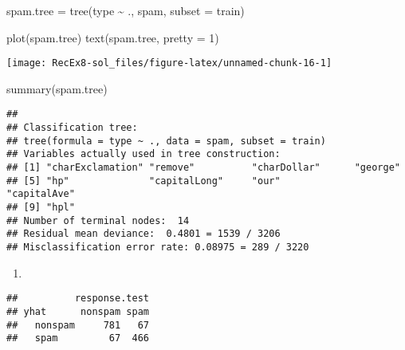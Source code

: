 \documentclass[
]{article}
\newenvironment{Shaded}{\begin{snugshade}}{\end{snugshade}}
\newcommand{\AttributeTok}[1]{\textcolor[rgb]{0.77,0.63,0.00}{#1}}
\newcommand{\DecValTok}[1]{\textcolor[rgb]{0.00,0.00,0.81}{#1}}
\newcommand{\FunctionTok}[1]{\textcolor[rgb]{0.00,0.00,0.00}{#1}}
\newcommand{\NormalTok}[1]{#1}
\newcommand{\OtherTok}[1]{\textcolor[rgb]{0.56,0.35,0.01}{#1}}
\newcommand{\SpecialCharTok}[1]{\textcolor[rgb]{0.00,0.00,0.00}{#1}}
\newcommand{\StringTok}[1]{\textcolor[rgb]{0.31,0.60,0.02}{#1}}
\providecommand{\tightlist}{%
  \setlength{\itemsep}{0pt}\setlength{\parskip}{0pt}}
\begin{document}
\begin{Shaded}
\begin{Highlighting}[]
\NormalTok{spam.tree }\OtherTok{=} \FunctionTok{tree}\NormalTok{(type }\SpecialCharTok{\textasciitilde{}}\NormalTok{ ., spam, }\AttributeTok{subset =}\NormalTok{ train)}

\FunctionTok{plot}\NormalTok{(spam.tree)}
\FunctionTok{text}\NormalTok{(spam.tree, }\AttributeTok{pretty =} \DecValTok{1}\NormalTok{)}
\end{Highlighting}
\end{Shaded}

\texttt{[image: RecEx8-sol\_files/figure-latex/unnamed-chunk-16-1]}

\begin{Shaded}
\begin{Highlighting}[]
\FunctionTok{summary}\NormalTok{(spam.tree)}
\end{Highlighting}
\end{Shaded}

\begin{verbatim}
## 
## Classification tree:
## tree(formula = type ~ ., data = spam, subset = train)
## Variables actually used in tree construction:
## [1] "charExclamation" "remove"          "charDollar"      "george"         
## [5] "hp"              "capitalLong"     "our"             "capitalAve"     
## [9] "hpl"            
## Number of terminal nodes:  14 
## Residual mean deviance:  0.4801 = 1539 / 3206 
## Misclassification error rate: 0.08975 = 289 / 3220
\end{verbatim}

\begin{enumerate}
\def\labelenumi{\alph{enumi})}
\setcounter{enumi}{3}
\tightlist
\item
\end{enumerate}

\begin{Shaded}
\end{Shaded}

\begin{verbatim}
##          response.test
## yhat      nonspam spam
##   nonspam     781   67
##   spam         67  466
\end{verbatim}
\end{document}
